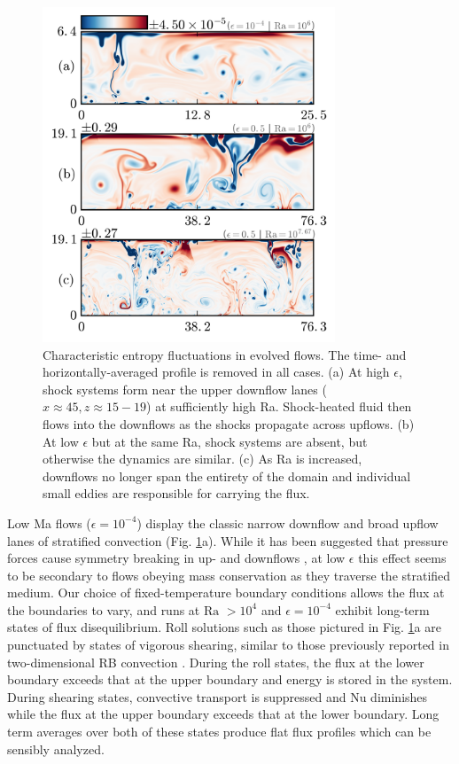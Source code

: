 \documentclass[aps, prl, twocolumn, nofootinbib, groupedaddress, amsfonts, amssymb, amsmath]{revtex4-1}
\begin{document}
\begin{figure}[t]
\includegraphics[width=3.4375in]{./figs/snapshots_fig.png}
\caption{Characteristic entropy fluctuations in evolved flows. 
The time- and horizontally-averaged profile is removed in all cases.  
(a) At high $\epsilon$, shock systems form near the upper downflow lanes 
($x \approx 45, z \approx 15-19$) at sufficiently high Ra.
Shock-heated fluid then flows into the downflows as the shocks propagate across upflows.
(b) At low $\epsilon$ but at the same Ra, shock systems are absent, 
but otherwise the dynamics are similar.  
(c) As Ra is increased, downflows no longer span
the entirety of the domain and individual 
small eddies are responsible for carrying the flux.
\label{fig:entropy_snapshots} }
\end{figure}

Low Ma flows ($\epsilon = 10^{-4}$)
display the classic narrow downflow and broad upflow lanes of stratified
convection (Fig. \ref{fig:entropy_snapshots}a).
While it has been suggested that pressure forces 
cause symmetry breaking in up- and downflows
\cite{hurlburt&all1984}, at low $\epsilon$ this 
effect seems to be secondary to flows obeying mass conservation as they traverse
the stratified medium.  
Our choice of fixed-temperature boundary conditions allows the flux at the 
boundaries to vary, and runs at $\text{Ra }> 10^4$
and $\epsilon = 10^{-4}$ exhibit long-term states of
flux disequilibrium.  
Roll solutions such as those pictured in Fig. \ref{fig:entropy_snapshots}a
are punctuated by states of vigorous shearing, similar to those previously
reported in two-dimensional RB convection \cite{goluskin&all2014}.  
During the roll states, 
the flux at the lower boundary exceeds that at the upper boundary
and energy is stored in the system.
During shearing states, 
convective transport is suppressed and Nu diminishes while
the flux at the upper boundary exceeds that at the lower boundary.  Long term
averages over both of these states produce flat flux profiles which
can be sensibly analyzed.
\end{document}

